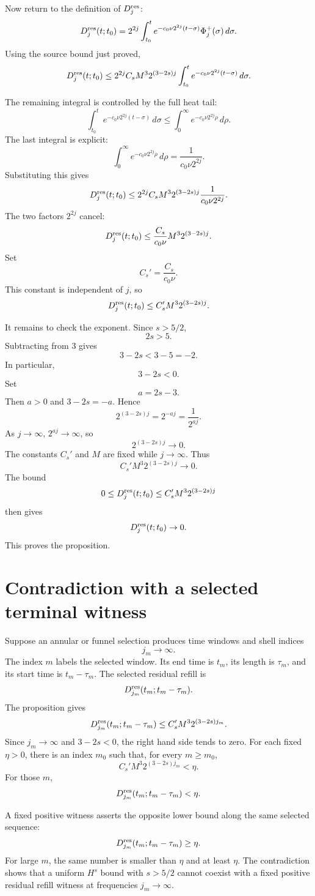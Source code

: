 \documentclass[11pt]{article}
\newcommand{\dd}{\,d}
\theoremstyle{definition}
\begin{document}
Now return to the definition of \(D_j^{\rm res}\):
\[
D_j^{\rm res}(t;t_0)
=
2^{2j}\int_{t_0}^{t}
e^{-c_0\nu2^{2j}(t-\sigma)}
\Phi_j^+(\sigma)\dd\sigma.
\]
Using the source bound just proved,
\[
D_j^{\rm res}(t;t_0)
\le
2^{2j}C_sM^3 2^{(3-2s)j}
\int_{t_0}^{t}
e^{-c_0\nu2^{2j}(t-\sigma)}\dd\sigma.
\]

The remaining integral is controlled by the full heat tail:
\[
\int_{t_0}^{t}
e^{-c_0\nu2^{2j}(t-\sigma)}\dd\sigma
\le
\int_0^\infty e^{-c_0\nu2^{2j}\rho}\dd\rho.
\]
The last integral is explicit:
\[
\int_0^\infty e^{-c_0\nu2^{2j}\rho}\dd\rho
=
\frac{1}{c_0\nu2^{2j}}.
\]
Substituting this gives
\[
D_j^{\rm res}(t;t_0)
\le
2^{2j}C_sM^3 2^{(3-2s)j}
\frac{1}{c_0\nu2^{2j}}.
\]
The two factors \(2^{2j}\) cancel:
\[
D_j^{\rm res}(t;t_0)
\le
\frac{C_s}{c_0\nu}M^3 2^{(3-2s)j}.
\]
Set
\[
C_s'=\frac{C_s}{c_0\nu}.
\]
This constant is independent of \(j\), so
\[
D_j^{\rm res}(t;t_0)
\le
C_s'M^3 2^{(3-2s)j}.
\]

It remains to check the exponent. Since \(s>5/2\),
\[
2s>5.
\]
Subtracting from \(3\) gives
\[
3-2s<3-5=-2.
\]
In particular,
\[
3-2s<0.
\]
Set
\[
a=2s-3.
\]
Then \(a>0\) and \(3-2s=-a\). Hence
\[
2^{(3-2s)j}=2^{-aj}=\frac{1}{2^{aj}}.
\]
As \(j\to\infty\), \(2^{aj}\to\infty\), so
\[
2^{(3-2s)j}\to0.
\]
The constants \(C_s'\) and \(M\) are fixed while \(j\to\infty\). Thus
\[
C_s'M^3 2^{(3-2s)j}\to0.
\]
The bound
\[
0\le D_j^{\rm res}(t;t_0)\le C_s'M^3 2^{(3-2s)j}
\]
then gives
\[
D_j^{\rm res}(t;t_0)\to0.
\]
This proves the proposition.

\section*{Contradiction with a selected terminal witness}

Suppose an annular or funnel selection produces time windows and shell indices
\[
j_m\to\infty.
\]
The index \(m\) labels the selected window. Its end time is \(t_m\), its length
is \(\tau_m\), and its start time is \(t_m-\tau_m\). The selected residual
refill is
\[
D_{j_m}^{\rm res}(t_m;t_m-\tau_m).
\]
The proposition gives
\[
D_{j_m}^{\rm res}(t_m;t_m-\tau_m)
\le
C_s'M^3 2^{(3-2s)j_m}.
\]
Since \(j_m\to\infty\) and \(3-2s<0\), the right hand side tends to zero. For
each fixed \(\eta>0\), there is an index \(m_0\) such that, for every
\(m\ge m_0\),
\[
C_s'M^3 2^{(3-2s)j_m}<\eta.
\]
For those \(m\),
\[
D_{j_m}^{\rm res}(t_m;t_m-\tau_m)<\eta.
\]

A fixed positive witness asserts the opposite lower bound along the same
selected sequence:
\[
D_{j_m}^{\rm res}(t_m;t_m-\tau_m)\ge\eta.
\]
For large \(m\), the same number is smaller than \(\eta\) and at least
\(\eta\). The contradiction shows that a uniform \(H^s\) bound with
\(s>5/2\) cannot coexist with a fixed positive residual refill witness at
frequencies \(j_m\to\infty\).
\end{document}

